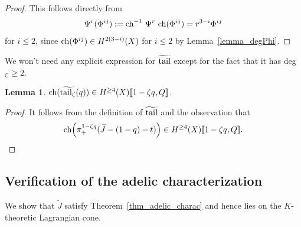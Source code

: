 \documentclass[11pt]{amsart}
\newtheorem{lemma}[theorem]{Lemma}
\newtheorem*{main theorem*}{Main Theorem}
\theoremstyle{remark}
\numberwithin{equation}{section}
\newcommand{\ch}{{\rm ch}}
\newcommand{\tail}{{\rm tail}}
\begin{document}
\begin{proof}
    This follows directly from 
    \[
    \Psi^r(\Phi^{ij}) := \ch^{-1} \ \Psi^r \ \ch (\Phi^{ij}) = r^{3-i} \Phi^{ij}
    \]
    for $i\leq 2$, since $\ch(\Phi^{ij}) \in H^{2(3-i)}(X)$ for $i\leq 2$ by Lemma~\ref{lemma_degPhi}.
\end{proof}
We won't need any explicit expression for $\widetilde{\tail}$ except for the fact that it has deg$_{\mathbb{C}} \geq 2$.
\begin{lemma} \label{lemma_tail_expansion}
    $\ch( \widetilde{\tail_{\zeta}}(q) ) \in H^{\geq 4}(X)[\![1-\zeta q,Q]\!]$.
\end{lemma}
\begin{proof}
    It follows from the definition of $\widetilde{\tail}$ and the observation that
    \[
    \ch \Big( \pi_+^{1-\zeta q}( \widetilde{J} - (1-q) - t )  \Big)\in H^{\geq 4}(X)[\![ 1-\zeta q, Q]\!].
    \]
\end{proof}


\subsection{Verification of the adelic characterization} \label{s:3.5}
We show that $\tilde{J}$ satisfy Theorem~\ref{thm_adelic_charac} and hence lies on the $K$-theoretic Lagrangian cone.
\end{document}
